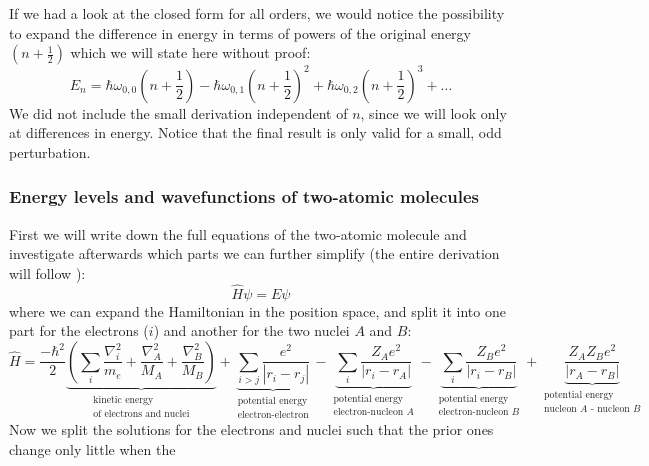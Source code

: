 If we had a look at the closed form for all orders, we would
notice the possibility to expand the difference in energy in terms
of powers of the original energy $(n+\frac{1}{2})$ which we will
state here without proof:
\begin{equation}
    E_n = \hbar \omega_{0,0} \left(n + \frac{1}{2} \right) 
    - \hbar \omega_{0,1} \left(n + \frac{1}{2} \right)^2  
    + \hbar \omega_{0,2} \left(n + \frac{1}{2} \right)^3  
    + \ldots
\end{equation}
We did not include the small derivation independent of $n$,
since we will look only at differences in energy. Notice that
the final result is only valid for a small, odd perturbation. 


\subsubsection{Energy levels and wavefunctions
    of two-atomic molecules}
First we will write down the full equations of the two-atomic
molecule and investigate afterwards which parts we can further
simplify (the entire derivation will follow \cite{staatsexamen}):
\begin{equation}
        \hat{H}\psi = E\psi 
\end{equation}
where we can expand the Hamiltonian in the position space,
and split it into one part for the electrons ($i$) and another 
for the two nuclei $A$ and $B$:
\begin{equation}
    \hat{H} = \frac{-\hbar^2}{2} 
        \underbrace{\left(
        \sum_{i}{\frac{\nabla_i^2}{m_e}}
        +\frac{\nabla_A^2}{M_A} +\frac{\nabla_B^2}{M_B}
\right)}_{
\substack{\text{kinetic energy}\\\text{of electrons and nuclei}}}
+ \underbrace{\sum_{i>j}{\frac{e^2}{|r_i - r_j|}}
    }_{\substack{\text{potential energy}\\\text{electron-electron}}}
 - \underbrace{\sum_{i}{\frac{Z_A e^2}{|r_i - r_A|}}
 }_{\substack{\text{potential energy}\\\text{electron-nucleon $A$}}}
 - \underbrace{\sum_{i}{\frac{Z_B e^2}{|r_i - r_B|}}
 }_{\substack{\text{potential energy}\\\text{electron-nucleon $B$}}}
 +  \underbrace{\frac{Z_A Z_B e^2}{|r_A - r_B|}
 }_{\substack{\text{potential energy}\\\text{nucleon $A$ - nucleon $B$}}}
\end{equation}
Now we split the solutions for the electrons and nuclei such
that the prior ones change only little when the
